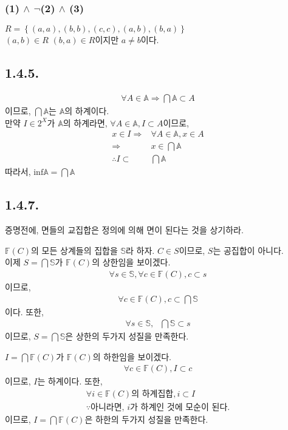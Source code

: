 \documentclass{article}
\begin{document}
\subsubsection{(1) $\wedge$ $\lnot$(2) $\wedge$ (3)}
$R = \left\{ (a, a), (b, b), (c, c), (a, b), (b, a) \right\}$
\\$(a, b) \in R$ $(b, a) \in R$이지만 $a \neq b$이다.



\subsection{1.4.5.}
\begin{align*}
\forall A \in \mathbb{A} \Rightarrow \bigcap \mathbb{A} \subset A
\end{align*}
이므로, $\bigcap \mathbb{A}$는 $\mathbb{A}$의 하계이다.
\\ 만약 $I \in 2^{X}$가 $\mathbb{A}$의 하계라면, $\forall A \in \mathbb{A}, I \subset A$이므로,
\begin{align*}
x \in I \Rightarrow& \forall A \in \mathbb{A}, x \in A
\\ \Rightarrow& x \in \bigcap \mathbb{A}
\\ \therefore I \subset& \bigcap \mathbb{A}
\end{align*}
따라서, $\text{inf} \mathbb{A} = \bigcap \mathbb{A}$


\subsection{1.4.7.}
증명전에, 면들의 교집합은 정의에 의해 면이 된다는 것을 상기하라.

$\mathbb{F}(C)$의 모든 상계들의 집합을 $\mathbb{S}$라 하자. $C \in S$이므로, $S$는 공집합이 아니다.
\\ 이제 $S = \bigcap \mathbb{S}$가 $\mathbb{F}(C)$의 상한임을 보이겠다.
\begin{align*}
\forall s \in \mathbb{S}, \forall c \in \mathbb{F}(C), c \subset s
\end{align*}이므로,
\begin{align*}
\forall c \in \mathbb{F}(C), c \subset \bigcap \mathbb{S}
\end{align*}이다. 또한, 
\begin{align*}
\forall s \in \mathbb{S}, \text{  } \bigcap \mathbb{S} \subset s
\end{align*}이므로, $S = \bigcap \mathbb{S}$은 상한의 두가지 성질을 만족한다.

$I = \bigcap \mathbb{F}(C)$가 $\mathbb{F}(C)$의 하한임을 보이겠다.
\begin{align*}
\forall c \in \mathbb{F}(C), I \subset c
\end{align*}이므로, $I$는 하계이다. 또한,
\begin{align*}
\forall i \in \text{$\mathbb{F}(C)$의 하계집합},  i \subset I
\\ \text{$\because$아니라면, $i$가 하계인 것에 모순이 된다.}
\end{align*}이므로, $I = \bigcap \mathbb{F}(C)$은 하한의 두가지 성질을 만족한다.
\end{document}
